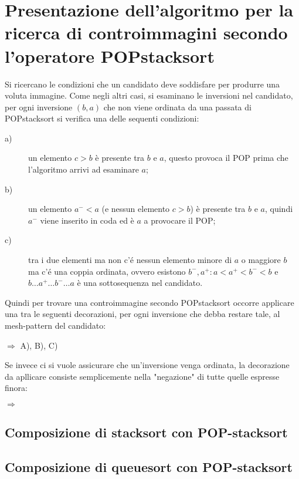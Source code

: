 \section*{Presentazione  dell'algoritmo per la ricerca di controimmagini secondo l'operatore POPstacksort}
Si ricercano le condizioni che un candidato deve soddisfare per produrre una voluta immagine. Come negli altri casi, si esaminano le inversioni nel candidato, per ogni inversione $(b,a)$ che non viene ordinata da una passata di POPstacksort si verifica una delle sequenti condizioni:
\begin{description}
	\item[a)] un elemento $c>b$ \`e presente tra $b$ e $a$, questo provoca il POP prima che l'algoritmo arrivi ad esaminare $a$;
	\item[b)] un elemento $a^-<a$ (e nessun elemento $c>b$) \`e presente tra $b$ e $a$, quindi $a^-$ viene inserito in coda ed \`e $a$ a provocare il POP;
	\item[c)] tra i due elementi ma non c'\'e nessun elemento minore di $a$ o maggiore $b$ ma c'\'e una coppia ordinata, ovvero esistono ${b^-,a^+}:a<a^+<b^-<b$ e $b\dots{a^+}\dots{b^-}\dots{a}$ \`e una sottosequenza nel candidato.
\end{description}
Quindi per trovare una controimmagine secondo POPstacksort occorre applicare una tra le seguenti decorazioni, per ogni inversione che debba restare tale, al mesh-pattern del candidato:
\begin{center}
$\Rightarrow$
A),
B),
C)
\end{center}
Se invece ci si vuole assicurare che un'inversione venga ordinata, la decorazione da apllicare consiste semplicemente nella "negazione" di tutte quelle espresse finora:
\begin{center}
$\Rightarrow$
\end{center}
\subsection*{Composizione di {stacksort} con {POP-stacksort}}
\subsection*{Composizione di {queuesort} con {POP-stacksort}}
